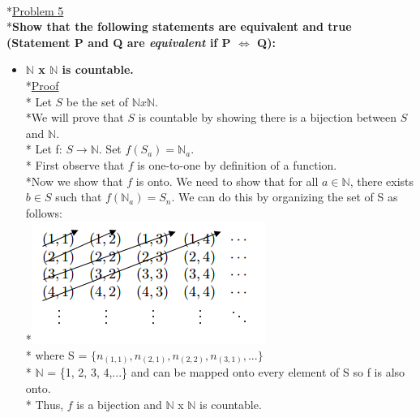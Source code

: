 \documentclass[12pt]{article}
\begin{document}
\noindent
\\*\uline{Problem 5}
\\*\textbf{Show that the following statements are equivalent and true (Statement P and Q are \textit{equivalent} if P $\iff$ Q):}
\begin{itemize}
\item \textbf{$\mathbb{N}$ x $\mathbb{N}$ is countable.}
\bigskip
\\*\uline{Proof}
\\* Let $S$ be the set of $\mathbb{N} x \mathbb{N}$.
\\*We will prove that $S$ is countable by showing there is a bijection between $S$ and $\mathbb{N}$.
\bigskip
\\* Let f: $S \rightarrow \mathbb{N}$. Set $f(S_a) = \mathbb{N}_a$. 
\bigskip
\\* First observe that $f$ is one-to-one by definition of a function.
\bigskip
\\*Now we show that $f$ is onto. We need to show that for all $a \in \mathbb{N}$, there exists $b \in S$ such that $f(\mathbb{N}_a) = S_n$. We can do this by organizing the set of S as follows:
\\*\includegraphics {NxN} %
\\* where S = $\{n_{(1,1)}, n_{(2,1)}, n_{(2,2)}, n_{(3,1)},...\}$
\\* $\mathbb{N}$ = \{1, 2, 3, 4,...\} and can be mapped onto every element of S so f is also onto.
\bigskip
\\* Thus, $f$ is a bijection and $\mathbb{N}$ x $\mathbb{N}$ is countable.
\bigskip
\newpage





\end{itemize}
\end{document}
